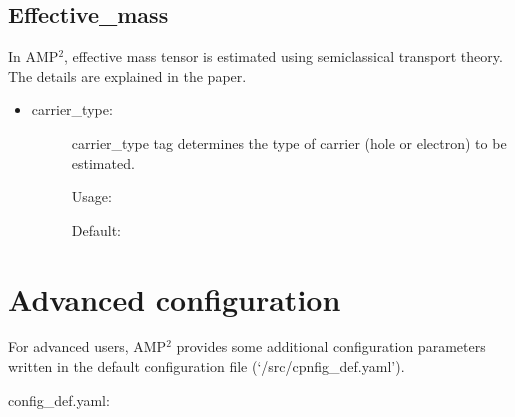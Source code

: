 \documentclass[letterpaper,10pt,english]{sphinxmanual}
\begin{document}
\subsection{Effective\_mass}
\label{\detokenize{Input/Configuration:effective-mass}}
In AMP$^{\text{2}}$, effective mass tensor is estimated using semiclassical transport theory.
The details are explained in the paper.
\begin{itemize}
\item {} \begin{description}
\item[{carrier\_type:}] \leavevmode
carrier\_type tag determines the type of carrier (hole or electron) to be estimated.

Usage:

\begin{sphinxVerbatim}[commandchars=\\\{\}]
       
\end{sphinxVerbatim}

Default:

\begin{sphinxVerbatim}[commandchars=\\\{\}]
     
     
\end{sphinxVerbatim}

\end{description}

\end{itemize}


\section{Advanced configuration}
\label{\detokenize{Input/Advanced_configuration:advanced-configuration}}\label{\detokenize{Input/Advanced_configuration::doc}}
For advanced users, AMP$^{\text{2}}$ provides some additional configuration parameters written in
the default configuration file (‘/src/cpnfig\_def.yaml’).

config\_def.yaml:
\end{document}
